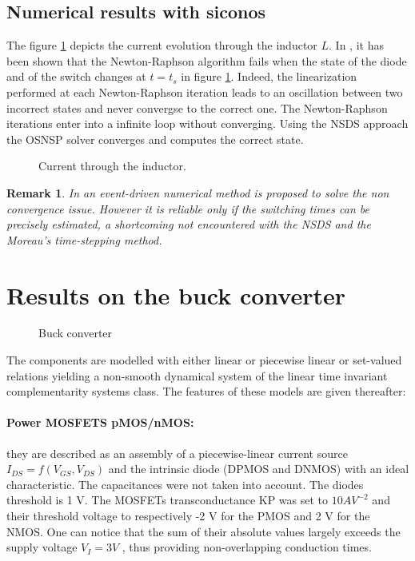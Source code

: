\documentclass{article}
\newtheorem{remark}{Remark}
\begin{document}
\subsection{Numerical results with {\sc siconos}}
\label{section32}

The figure \ref{fig:SIMU_CS} depicts the current evolution through the inductor $L$. In \cite{maffezzoni2006}, it has been shown that the Newton-Raphson algorithm fails when the state of the diode and of the switch changes at $t=t_s$ in figure \ref{fig:SIMU_CS}. Indeed, the linearization performed at each Newton-Raphson iteration leads to an oscillation between two incorrect states and never convergse to the correct one. The Newton-Raphson iterations enter into a infinite loop without converging.  Using the NSDS approach the OSNSP solver converges and computes the correct state. 


 \begin{figure}[h]
   
  \label{fig:SIMU_CS}
\caption{Current through the inductor.}
 \end{figure}


\begin{remark}
In \cite{maffezzoni2006} an event-driven numerical method is proposed to solve the non convergence issue. However it is reliable only if the switching times can be precisely estimated, a shortcoming not encountered  with the NSDS and the  Moreau's time-stepping method. 
\end{remark}

\section{Results on the buck converter}
\label{section4}


\begin{figure}[h]
\centerline{
 \scalebox{1.0}{
    
 }
}
\caption{Buck converter}
\label{fig-Buck-converter}
\end{figure}
The components are modelled with either linear or piecewise linear or set-valued relations yielding a non-smooth dynamical system of the linear time invariant complementarity systems class. The features of these models are given thereafter:

\paragraph{Power MOSFETS pMOS/nMOS:} they are described as an assembly of a
piecewise-linear current source $I_{DS} = f(V_{GS}, V_{DS})$ and the intrinsic diode
(DPMOS and DNMOS) with an ideal characteristic.
The capacitances were not taken into account. The diodes threshold is
1 V. The MOSFETs transconductance KP was set to $10 AV^{-2}$ and
their threshold voltage to respectively -2 V for the PMOS and 2 V for
the NMOS. One can notice that the sum of their absolute values largely
exceeds the supply voltage $V_{I} = 3 V$ , thus providing non-overlapping
conduction times.
\end{document}

